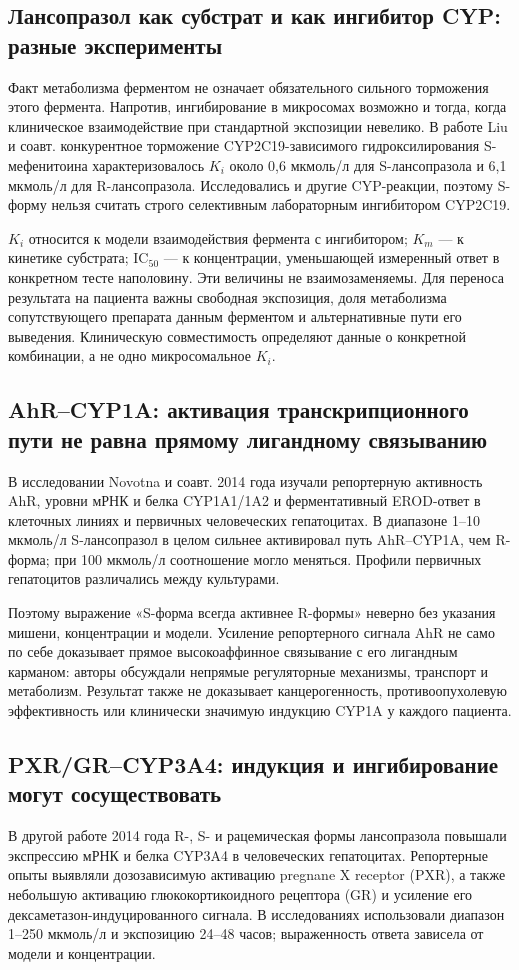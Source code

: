 \documentclass[11pt,a4paper,notitlepage]{report}
\newcommand{\src}[1]{\unskip\space\cite{#1}}
\begin{document}
\subsection{Лансопразол как субстрат и как ингибитор CYP: разные эксперименты}
Факт метаболизма ферментом не означает обязательного сильного торможения этого фермента. Напротив, ингибирование в микросомах возможно и тогда, когда клиническое взаимодействие при стандартной экспозиции невелико. В работе Liu и соавт. конкурентное торможение CYP2C19-зависимого гидроксилирования S-мефенитоина характеризовалось $K_i$ около 0,6 мкмоль/л для S-лансопразола и 6,1 мкмоль/л для R-лансопразола. Исследовались и другие CYP-реакции, поэтому S-форму нельзя считать строго селективным лабораторным ингибитором CYP2C19.\src{molcypinhib}

$K_i$ относится к модели взаимодействия фермента с ингибитором; $K_m$ --- к кинетике субстрата; IC$_{50}$ --- к концентрации, уменьшающей измеренный ответ в конкретном тесте наполовину. Эти величины не взаимозаменяемы. Для переноса результата на пациента важны свободная экспозиция, доля метаболизма сопутствующего препарата данным ферментом и альтернативные пути его выведения. Клиническую совместимость определяют данные о конкретной комбинации, а не одно микросомальное $K_i$.\src{molcypinhib,uslabel}

\subsection{AhR--CYP1A: активация транскрипционного пути не равна прямому лигандному связыванию}
В исследовании Novotna и соавт. 2014 года изучали репортерную активность AhR, уровни мРНК и белка CYP1A1/1A2 и ферментативный EROD-ответ в клеточных линиях и первичных человеческих гепатоцитах. В диапазоне 1--10 мкмоль/л S-лансопразол в целом сильнее активировал путь AhR--CYP1A, чем R-форма; при 100 мкмоль/л соотношение могло меняться. Профили первичных гепатоцитов различались между культурами.\src{molahr}

Поэтому выражение «S-форма всегда активнее R-формы» неверно без указания мишени, концентрации и модели. Усиление репортерного сигнала AhR не само по себе доказывает прямое высокоаффинное связывание с его лигандным карманом: авторы обсуждали непрямые регуляторные механизмы, транспорт и метаболизм. Результат также не доказывает канцерогенность, противоопухолевую эффективность или клинически значимую индукцию CYP1A у каждого пациента.\src{molahr}

\subsection{PXR/GR--CYP3A4: индукция и ингибирование могут сосуществовать}
В другой работе 2014 года R-, S- и рацемическая формы лансопразола повышали экспрессию мРНК и белка CYP3A4 в человеческих гепатоцитах. Репортерные опыты выявляли дозозависимую активацию pregnane X receptor (PXR), а также небольшую активацию глюкокортикоидного рецептора (GR) и усиление его дексаметазон-индуцированного сигнала. В исследованиях использовали диапазон 1--250 мкмоль/л и экспозицию 24--48 часов; выраженность ответа зависела от модели и концентрации.\src{molpxr}
\end{document}
